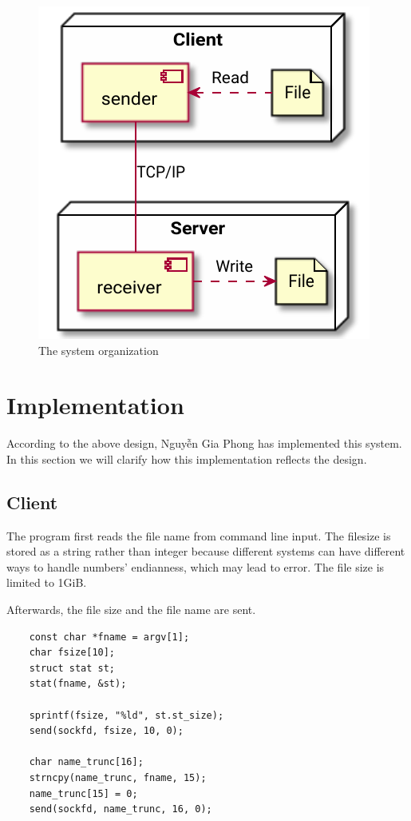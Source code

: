 \documentclass{article}
\begin{document}
\begin{figure}
	\centering
	\includegraphics{pw1/system-org.pdf}
	\caption{The system organization}
\end{figure}

\section{Implementation}

According to the above design,  Nguyễn Gia Phong  has implemented this system.
In this section we will clarify how this implementation reflects the design.

\subsection{Client}

The program first reads the file name from command line input.
The filesize is stored as a string rather than integer
because different systems can have different ways to handle numbers' endianness,
which may lead to error. The file size is limited to 1GiB.

Afterwards, the file size and the file name are sent.

\begin{verbatim}
	const char *fname = argv[1];
	char fsize[10];
	struct stat st;
	stat(fname, &st);

	sprintf(fsize, "%ld", st.st_size);
	send(sockfd, fsize, 10, 0);

	char name_trunc[16];
	strncpy(name_trunc, fname, 15);
	name_trunc[15] = 0;
	send(sockfd, name_trunc, 16, 0);
\end{verbatim}
\end{document}
